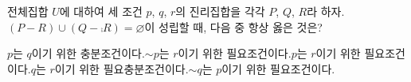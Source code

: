 전체집합 $U$에 대하여 세 조건 $p$, $q$, $r$의 진리집합을 각각 $P$, $Q$, $R$라 하자. $(P-R)\cup(Q-\comp{R})=\varnothing$이 성립할 때, 다음 중 항상 옳은 것은? 
\begin{choicesv}{$p$는 $q$이기 위한 충분조건이다.}{$\sim p$는 $r$이기 위한 필요조건이다.}{$p$는 $r$이기 위한 필요조건이다.}{$q$는 $r$이기 위한 필요충분조건이다.}{$\sim q$는 $p$이기 위한 필요조건이다.}\end{choicesv}
